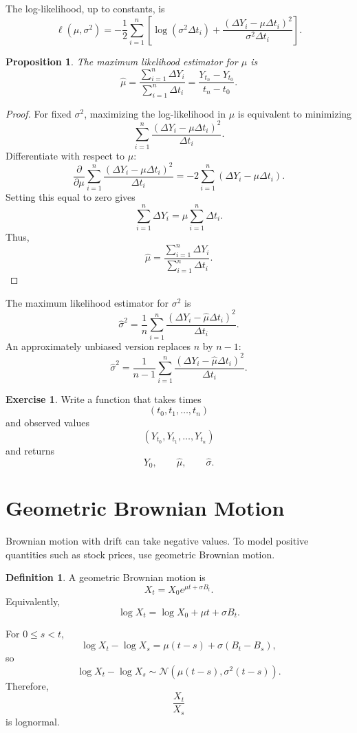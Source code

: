 \documentclass[12pt,oneside]{book}
\numberwithin{equation}{section}
\theoremstyle{definition}
\newtheorem{definition}{Definition}[section]
\newtheorem{exercise}{Exercise}[section]
\theoremstyle{plain}
\newtheorem{proposition}{Proposition}[section]
\theoremstyle{remark}
\newcommand{\Normal}{\mathcal{N}}
\begin{document}
The log-likelihood, up to constants, is
\[
\ell(\mu,\sigma^2)
=
-\frac{1}{2}\sum_{i=1}^n
\left[
\log(\sigma^2\Delta t_i)
+
\frac{(\Delta Y_i-\mu\Delta t_i)^2}{\sigma^2\Delta t_i}
\right].
\]

\begin{proposition}
The maximum likelihood estimator for $\mu$ is
\[
\hat{\mu}
=
\frac{\sum_{i=1}^n \Delta Y_i}{\sum_{i=1}^n \Delta t_i}
=
\frac{Y_{t_n}-Y_{t_0}}{t_n-t_0}.
\]
\end{proposition}

\begin{proof}
For fixed $\sigma^2$, maximizing the log-likelihood in $\mu$ is equivalent to minimizing
\[
\sum_{i=1}^n
\frac{(\Delta Y_i-\mu\Delta t_i)^2}{\Delta t_i}.
\]
Differentiate with respect to $\mu$:
\[
\frac{\partial}{\partial \mu}
\sum_{i=1}^n
\frac{(\Delta Y_i-\mu\Delta t_i)^2}{\Delta t_i}
=
-2\sum_{i=1}^n(\Delta Y_i-\mu\Delta t_i).
\]
Setting this equal to zero gives
\[
\sum_{i=1}^n \Delta Y_i
=
\mu\sum_{i=1}^n \Delta t_i.
\]
Thus,
\[
\hat{\mu}
=
\frac{\sum_{i=1}^n \Delta Y_i}{\sum_{i=1}^n \Delta t_i}.
\]
\end{proof}

The maximum likelihood estimator for $\sigma^2$ is
\[
\hat{\sigma}^2
=
\frac{1}{n}
\sum_{i=1}^n
\frac{(\Delta Y_i-\hat{\mu}\Delta t_i)^2}{\Delta t_i}.
\]
An approximately unbiased version replaces $n$ by $n-1$:
\[
\hat{\sigma}^2
=
\frac{1}{n-1}
\sum_{i=1}^n
\frac{(\Delta Y_i-\hat{\mu}\Delta t_i)^2}{\Delta t_i}.
\]

\begin{exercise}
Write a function that takes times
\[
(t_0,t_1,\ldots,t_n)
\]
and observed values
\[
(Y_{t_0},Y_{t_1},\ldots,Y_{t_n})
\]
and returns
\[
Y_0,\qquad \hat{\mu},\qquad \hat{\sigma}.
\]
\end{exercise}

\section{Geometric Brownian Motion}

Brownian motion with drift can take negative values. To model positive quantities such as stock prices, use geometric Brownian motion.

\begin{definition}
A geometric Brownian motion is
\[
X_t=X_0 e^{\mu t+\sigma B_t}.
\]
Equivalently,
\[
\log X_t=\log X_0+\mu t+\sigma B_t.
\]
\end{definition}

For $0\le s<t$,
\[
\log X_t-\log X_s
=
\mu(t-s)+\sigma(B_t-B_s),
\]
so
\[
\log X_t-\log X_s
\sim
\Normal(\mu(t-s),\sigma^2(t-s)).
\]
Therefore,
\[
\frac{X_t}{X_s}
\]
is lognormal.
\end{document}
